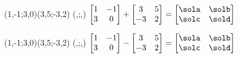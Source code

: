 \MATRIXADD(1,-1;3,0)(3,5;-3,2)%
          (\sola,\solb;\solc,\sold)
$\begin{bmatrix}
       1 & -1 \\ 3 & 0
     \end{bmatrix}+
\begin{bmatrix}
       3 & 5 \\ -3 & 2
     \end{bmatrix}=\begin{bmatrix}
       \sola & \solb \\ \solc & \sold
     \end{bmatrix}$

\MATRIXSUB(1,-1;3,0)(3,5;-3,2)%
          (\sola,\solb;\solc,\sold)
$\begin{bmatrix}
       1 & -1 \\ 3 & 0
     \end{bmatrix}-
\begin{bmatrix}
       3 & 5 \\ -3 & 2
     \end{bmatrix}=\begin{bmatrix}
       \sola & \solb \\ \solc & \sold
     \end{bmatrix}$

